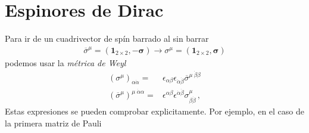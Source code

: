 \section{Espinores de Dirac}

Para ir de un cuadrivector de spín barrado al sin barrar
   \begin{align}
 \overline{\sigma}^{\mu}=\left( \boldsymbol{1}_{2\times2},-{\boldsymbol{\sigma}} \right) \rightarrow
\sigma^{\mu}= \left( \boldsymbol{1}_{2\times2},\boldsymbol{\sigma} \right)
\end{align}
podemos usar la \emph{métrica de Weyl}
\begin{align}
  \left( \sigma^{\mu} \right)_{\alpha\dot{\alpha}}=&\epsilon_{\alpha\beta}\epsilon_{\dot{\alpha}\dot{\beta}}\overline{\sigma}^{\mu\ \dot{\beta}\beta} \nonumber\\
  \left( \overline{\sigma}^{\mu} \right)^{\mu\;\dot{\alpha}\alpha}=&\epsilon^{\alpha\beta}\epsilon^{\dot{\alpha}\dot{\beta}}{\sigma}^{\mu}_{\beta\dot{\beta}} \,,
\end{align}
Estas expresiones se pueden comprobar explicitamente. Por ejemplo, en el caso de la primera matriz de Pauli
